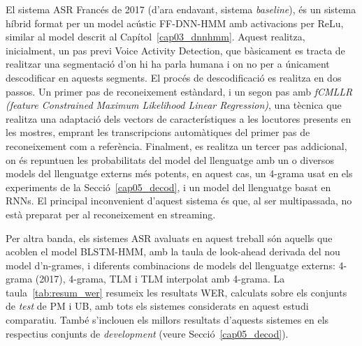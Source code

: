 El sistema ASR Francés de 2017 (d'ara endavant, sistema \textit{baseline}), és un sistema híbrid format per un model acústic FF-DNN-HMM amb activacions per ReLu, similar al model descrit al Capítol~\ref{cap03_dnnhmm}.
Aquest realitza, inicialment, un pas previ \guillemotleft Voice Activity Detection\guillemotright, que bàsicament es tracta de realitzar una segmentació d'on hi ha parla humana i on no per a únicament descodificar en aquests segments.
El procés de descodificació es realitza en dos passos. Un primer pas de reconeixement estàndard, i un segon pas amb \textit{fCMLLR (feature Constrained Maximum Likelihood Linear Regression)}, una tècnica que realitza una adaptació dels vectors de característiques a les locutores presents en les mostres, emprant les transcripcions automàtiques del primer pas de reconeixement com a referència.
Finalment, es realitza un tercer pas addicional, on és repuntuen les probabilitats del model del llenguatge amb un o diversos models del llenguatge externs més potents, en aquest cas, un 4-grama usat en els experiments de la Secció~\ref{cap05_decod}, i un model del llenguatge basat en RNNs.
El principal inconvenient d'aquest sistema és que, al ser multipassada, no està preparat per al reconeixement en streaming.

Per altra banda, els sistemes ASR avaluats en aquest treball són aquells que acoblen el model BLSTM-HMM, amb la taula de look-ahead derivada del nou model d'n-grames, i diferents combinacions de models del llenguatge externs: 4-grama (2017), 4-grama, TLM i TLM interpolat amb 4-grama.
La taula~\ref{tab:resum_wer} resumeix les resultats WER, calculats sobre els conjunts de \textit{test} de PM i UB, amb tots els sistemes considerats en aquest estudi comparatiu.
També s'inclouen els millors resultats d'aquests sistemes en els respectius conjunts de \textit{development} (veure Secció~\ref{cap05_decod}).


